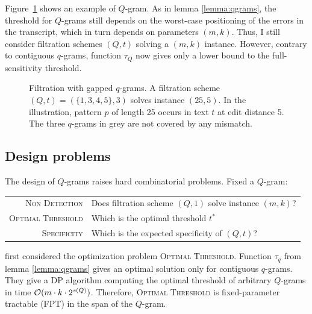 Figure~\ref{fig:qgrams-gapped} shows an example of $Q$-gram.
As in lemma \ref{lemma:qgrams}, the threshold for $Q$-grams still depends on the worst-case positioning of the errors in the transcript, which in turn depends on parameters $(m,k)$.
Thus, I still consider filtration schemes $(Q,t)$ solving a $(m,k)$ instance.
However, contrary to contiguous $q$-grams, function $\tau_Q$ now gives only a lower bound to the full-sensitivity threshold.

\begin{figure}[t]
\begin{center}
\caption[Filtration with gapped $q$-grams]{Filtration with gapped $q$-grams. A filtration scheme $(Q,t) = (\{1, 3, 4, 5\},3)$ solves instance $(25,5)$. In the illustration, pattern $p$ of length 25 occurs in text $t$ at edit distance 5. The three $q$-grams in grey are not covered by any mismatch.}
\label{fig:qgrams-gapped}

\end{center}
\end{figure}


\subsection{Design problems}
\label{sub:qgram:design}

The design of $Q$-grams raises hard combinatorial problems.
Fixed a $Q$-gram:

\begin{table}[h]
\begin{tabular}{rl}
\textsc{Non Detection} & Does filtration scheme $(Q,1)$ solve instance $(m,k)$?\\
\textsc{Optimal Threshold} & Which is the optimal threshold $t^*$ \st $(Q,t^*)$ solves $(m,k)$?\\
\textsc{Specificity} & Which is the expected specificity of $(Q,t)$?\\
\end{tabular}
\end{table}

\cite{Burkhardt2001} first considered the optimization problem \textsc{Optimal Threshold}.
Function $\tau_q$ from lemma \ref{lemma:qgrams} gives an optimal solution only for contiguous $q$-grams.
They give a DP algorithm computing the optimal threshold of arbitrary $Q$-grams in time $\mathcal{O}(m \cdot k \cdot 2^{s(Q)})$.
Therefore, \textsc{Optimal Threshold} is fixed-parameter tractable (FPT) in the span of the $Q$-gram.

